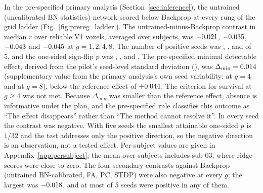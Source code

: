 In the pre-specified primary analysis (Section~\ref{sec:inference}), the untrained
(uncalibrated BN statistics) network scored below Backprop at every rung of the grid
ladder (Fig.~\ref{fig:prereg_ladder}). The untrained-minus-Backprop contrast in median
$r$ over reliable V1 voxels, averaged over subjects, was $-0.021$,
$-0.035$, $-0.043$ and $-0.045$ at $g = 1, 2, 4, 8$.
The number of positive seeds was \PreregRandBpGOnePos, \PreregRandBpGTwoPos,
\PreregRandBpGFourPos{} and \PreregRandBpGEightPos{} of 5, and the one-sided sign-flip
$p$ was \PreregRandBpGOneP, \PreregRandBpGTwoP, \PreregRandBpGFourP{} and
\PreregRandBpGEightP. The pre-specified minimal detectable effect, derived from the
pilot's seed-level standard deviation (\PreregPilotSd), was
$\Delta_{\min} = 0.014$ (supplementary value from the primary analysis's own
seed variability: \PreregRandBpGFourDmin{} at $g = 4$ and \PreregRandBpGEightDmin{} at
$g = 8$), below the reference effect of $+0.044$. The criterion for
survival at $g \geq 4$ was not met. Because $\Delta_{\min}$ was smaller than the
reference effect, absence is informative under the plan, and the pre-specified rule
classifies this outcome as ``The effect disappears'' rather than ``The method cannot
resolve it''. In every seed the contrast was negative. With five seeds the smallest attainable one-sided $p$ is $1/32$ and the test addresses only the positive direction, so the negative direction is an observation, not a tested effect. Per-subject values are given in Appendix~\ref{app:persubject}; the mean over subjects includes sub-03, where ridge scores were close to zero. The four
secondary contrasts against Backprop (untrained BN-calibrated, FA, PC, STDP) were also
negative at every $g$; the largest was $-0.018$, and at most
\PreregSecondaryMaxPos{} of 5 seeds were positive in any of them.

